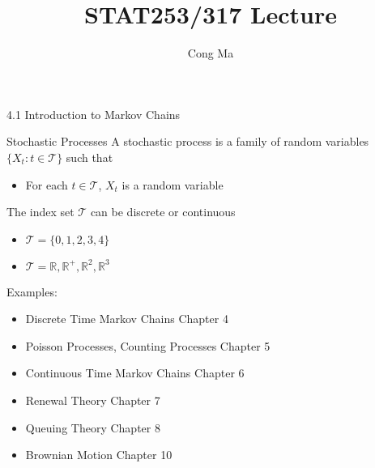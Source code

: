 \documentclass[letterpaper,mathserif,handout]{beamer}
\title{STAT253/317 Lecture \chapnum}
\date{}
\author{Cong Ma}
\begin{document}
\begin{frame}
\maketitle\bigskip
\begin{center}
4.1 Introduction to Markov Chains
\end{center}
\end{frame}
\begin{frame}{Stochastic Processes}
A stochastic process is a family of random variables $\{X_t: t\in\mathcal{T}\}$ such that
\begin{itemize}
\item For each $t\in\mathcal{T}$, $X_t$ is a random variable
\end{itemize}
The index set $\mathcal{T}$ can be discrete or continuous
\begin{itemize}\normalsize
\item $\mathcal{T}=\{0,1,2,3,4\}$
\item $\mathcal{T}=\mathbb{R}, \mathbb{R}^+, \mathbb{R}^2, \mathbb{R}^3$
\end{itemize}

Examples:
\begin{itemize}
\item Discrete Time Markov Chains \dotfill Chapter 4
\item Poisson Processes, Counting Processes \dotfill Chapter 5
\item Continuous Time Markov Chains \dotfill Chapter 6
\item Renewal Theory  \dotfill Chapter 7
\item Queuing Theory  \dotfill Chapter 8
\item Brownian Motion \dotfill Chapter 10
\end{itemize}
\end{frame}
\end{document}
